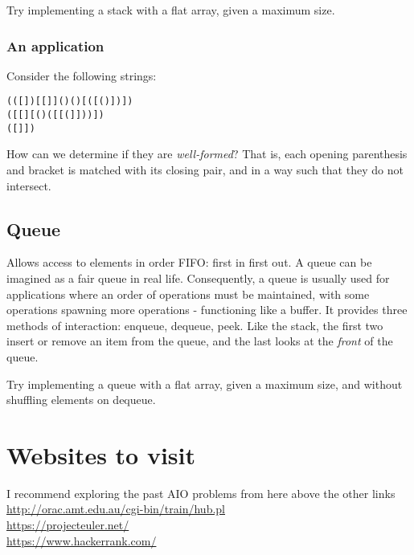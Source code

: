 \documentclass{article}
\begin{document}
Try implementing a stack with a flat array, given a maximum size.

\subsubsection{An application}
Consider the following strings:
\begin{verbatim}
(([])[[]]()()[([()])])
([[][()([[(]]))])
([]])
\end{verbatim}

\noindent How can we determine if they are \emph{well-formed}? That is, each opening parenthesis and bracket is matched with its closing pair, and in a way such that they do not intersect. 
\subsection{Queue}
Allows access to elements in order FIFO: first in first out. A queue can be imagined as a fair queue in real life. Consequently, a queue is usually used for applications where an order of operations must be maintained, with some operations spawning more operations - functioning like a buffer. It provides three methods of interaction: enqueue, dequeue, peek. Like the stack, the first two insert or remove an item from the queue, and the last looks at the \emph{front} of the queue.

Try implementing a queue with a flat array, given a maximum size, and without shuffling elements on dequeue.

\section{Websites to visit}
I recommend exploring the past AIO problems from here above the other links\\
\url{http://orac.amt.edu.au/cgi-bin/train/hub.pl}\\
\url{https://projecteuler.net/}\\
\url{https://www.hackerrank.com/}\\
\end{document}
